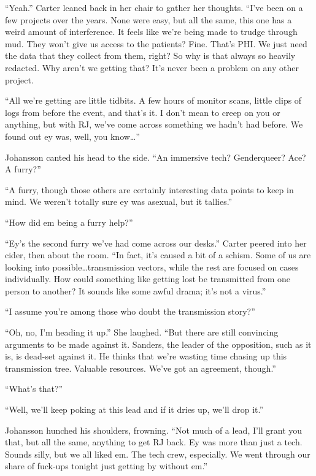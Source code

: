 ``Yeah.'' Carter leaned back in her chair to gather her thoughts. ``I've been on a few projects over the years. None were easy, but all the same, this one has a weird amount of interference. It feels like we're being made to trudge through mud. They won't give us access to the patients? Fine. That's PHI. We just need the data that they collect from them, right? So why is that always so heavily redacted. Why aren't we getting that? It's never been a problem on any other project.

``All we're getting are little tidbits. A few hours of monitor scans, little clips of logs from before the event, and that's it. I don't mean to creep on you or anything, but with RJ, we've come across something we hadn't had before. We found out ey was, well, you know\ldots{}''

Johansson canted his head to the side. ``An immersive tech? Genderqueer? Ace? A furry?''

``A furry, though those others are certainly interesting data points to keep in mind. We weren't totally sure ey was asexual, but it tallies.''

``How did em being a furry help?''

``Ey's the second furry we've had come across our desks.'' Carter peered into her cider, then about the room. ``In fact, it's caused a bit of a schism. Some of us are looking into possible\ldots{}transmission vectors, while the rest are focused on cases individually. How could something like getting lost be transmitted from one person to another? It sounds like some awful drama; it's not a virus.''

``I assume you're among those who doubt the transmission story?''

``Oh, no, I'm heading it up.'' She laughed. ``But there are still convincing arguments to be made against it. Sanders, the leader of the opposition, such as it is, is dead-set against it. He thinks that we're wasting time chasing up this transmission tree. Valuable resources. We've got an agreement, though.''

``What's that?''

``Well, we'll keep poking at this lead and if it dries up, we'll drop it.''

Johansson hunched his shoulders, frowning. ``Not much of a lead, I'll grant you that, but all the same, anything to get RJ back. Ey was more than just a tech. Sounds silly, but we all liked em. The tech crew, especially. We went through our share of fuck-ups tonight just getting by without em.''

